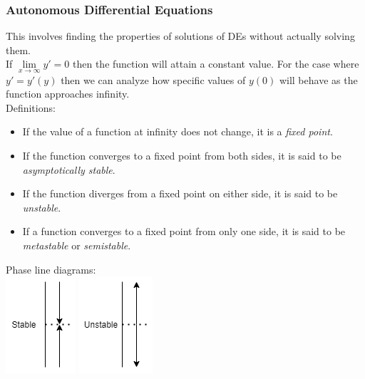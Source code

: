 \subsubsection{Autonomous Differential Equations}
This involves finding the properties of solutions of DEs without actually solving them.\\
If $\lim\limits_{x\to\infty}y'=0$ then the function will attain a constant value. For the case where $y'=y'(y)$ then we can analyze how specific values of $y(0)$ will behave as the function approaches infinity.\\
Definitions:
\begin{itemize}
    \item If the value of a function at infinity does not change, it is a \textit{fixed point}.
    \item If the function converges to a fixed point from both sides, it is said to be \textit{asymptotically stable}.
    \item If the function diverges from a fixed point on either side, it is said to be \textit{unstable}.
    \item If a function converges to a fixed point from only one side, it is said to be \textit{metastable} or \textit{semistable}.
\end{itemize}
Phase line diagrams:\\
\includegraphics[scale=1]{Images/ODEPictures/PhaseLineStable.png} \includegraphics[scale=1]{Images/ODEPictures/PhaseLineUnstable.png}
